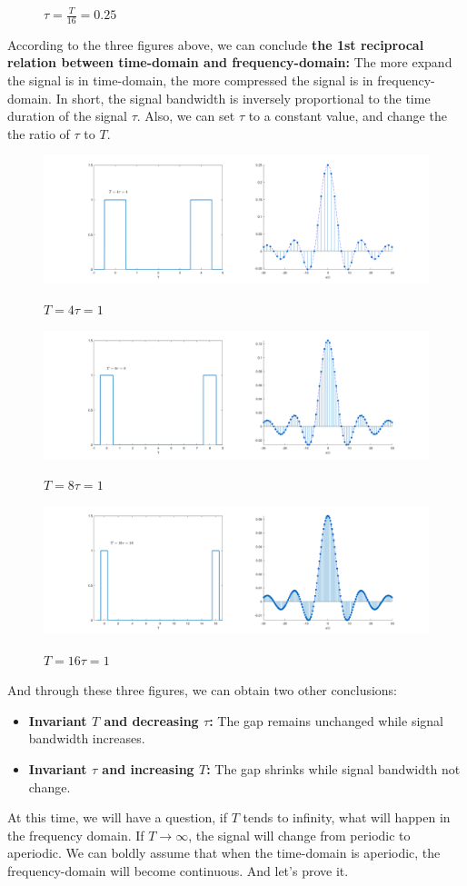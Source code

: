 \documentclass[margin,line]{res}
\begin{document}
\begin{resume}
\begin{figure}[H]
	\centerline{\textbf{$\tau = \frac{T}{16} = 0.25$}}
\end{figure}
According to the three figures above, we can conclude 
\textbf{the 1st reciprocal relation between time-domain and frequency-domain:} 
The more expand the signal is in time-domain, the more compressed the signal is in frequency-domain. In short, the signal bandwidth is inversely proportional to the time duration of the signal $\tau$.
Also, we can set $\tau$ to a constant value, and change the the ratio of $\tau$ to $T$.
\begin{figure}[H]
	\centerline{\includegraphics[width=0.9\linewidth]{figure/bw_4.png}}
	\centerline{\textbf{$T = 4\tau = 1$}}
\end{figure}
\begin{figure}[H]
	\centerline{\includegraphics[width=0.9\linewidth]{figure/bw_5.png}}
	\centerline{\textbf{$T = 8\tau = 1$}}
\end{figure}
\begin{figure}[H]
	\centerline{\includegraphics[width=0.9\linewidth]{figure/bw_6.png}}
	\centerline{\textbf{$T = 16\tau = 1$}}
\end{figure}
And through these three figures, we can obtain two other conclusions:
\begin{itemize}
	\item \textbf{Invariant $T$ and decreasing $\tau$:} The gap remains unchanged while signal bandwidth increases.
	\item \textbf{Invariant $\tau$ and increasing $T$:} The gap shrinks while signal bandwidth not change.
\end{itemize}
At this time, we will have a question, if $T$ tends to infinity, what will happen in the frequency domain. If $T\rightarrow \infty$, the signal will change from periodic to aperiodic. We can boldly assume that when the time-domain is aperiodic, the frequency-domain will become continuous. And let's prove it.
\clearpage


\end{resume}
\end{document}
